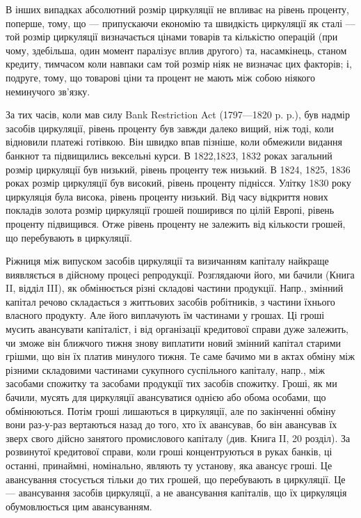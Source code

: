 В інших випадках абсолютний розмір циркуляції не впливає на рівень
проценту, поперше, тому, що — припускаючи економію та швидкість циркуляції
як сталі — той розмір циркуляції визначається цінами товарів та кількістю операцій
(при чому, здебільша, один момент паралізує вплив другого) та, насамкінець,
станом кредиту, тимчасом коли навпаки сам той розмір ніяк не визначає
цих факторів; і, подруге, тому, що товарові ціни та процент не мають між собою
ніякого неминучого зв’язку.

За тих часів, коли мав силу Bank Restriction Act (1797—1820 p. p.),
був надмір засобів циркуляції, рівень проценту був завжди далеко вищий, ніж
тоді, коли відновили платежі готівкою. Він швидко впав пізніше, коли обмежили
видання банкнот та підвищились вексельні курси. В 1822,1823, 1832 роках
загальний розмір циркуляції був низький, рівень проценту теж низький. В 1824,
1825, 1836 роках розмір циркуляції був високий, рівень проценту піднісся.
Улітку 1830 року циркуляція була висока, рівень проценту низький. Від часу
відкриття нових покладів золота розмір циркуляції грошей поширився по цілій
Европі, рівень проценту підвищився. Отже рівень проценту не залежить від
кількости грошей, що перебувають в циркуляції.

Ріжниця між випуском засобів циркуляції та визичанням капіталу найкраще
виявляється в дійсному процесі репродукції. Розглядаючи його, ми бачили (Книга II,
відділ III), як обмінюється різні складові частини продукції. Напр., змінний капітал
речово складається з життьових засобів робітників, з частини їхнього власного
продукту. Але його виплачують їм частинами у грошах. Ці гроші мусить
авансувати капіталіст, і від організації кредитової справи дуже залежить, чи
зможе він ближчого тижня знову виплатити новий змінний капітал старими
грішми, що він їх платив минулого тижня. Те саме бачимо ми в актах обміну
між різними складовими частинами сукупного суспільного капіталу, напр., між
засобами спожитку та засобами продукції тих засобів спожитку. Гроші, як ми
бачили, мусять для циркуляції авансуватися однією або обома особами, що обмінюються.
Потім гроші лишаються в циркуляції, але по закінченні обміну вони
раз-у-раз вертаються назад до того, хто їх авансував, бо він авансував їх зверх
свого дійсно занятого промислового капіталу (див. Книга II, 20 розділ). За розвинутої
кредитової справи, коли гроші концентруються в руках банків, ці останні,
принаймні, номінально, являють ту установу, яка авансує гроші. Це авансування
стосується тільки до тих грошей, що перебувають в циркуляції. Це — авансування
засобів циркуляції, а не авансування капіталів, що їх циркуляція обумовлюється
цим авансуванням.

